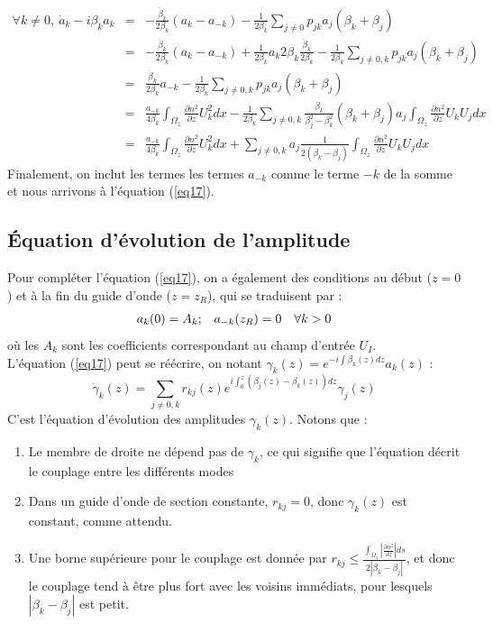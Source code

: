 \documentclass{article}
\begin{document}
\begin{eqnarray*}
\forall k\neq 0,\ \dot{a}_k-i\beta_ka_k&=&-\frac{\dot{\beta}_k}{2\beta_k}(a_k-a_{-k})-\frac{1}{2\beta_k}\sum_{j\neq 0}p_{jk}a_j(\beta_k+\beta_j)\\
		&=&-\frac{\dot{\beta}_k}{2\beta_k}(a_k-a_{-k})+\frac{1}{2\beta_k}a_k2\beta_k\frac{\dot{\beta}_k}{2\beta_k}-\frac{1}{2\beta_k}\sum_{j\neq 0,k}p_{jk}a_j(\beta_k+\beta_j)\\
		&=&\frac{\dot{\beta}_k}{2\beta_k}a_{-k}-\frac{1}{2\beta_k}\sum_{j\neq 0,k}p_{jk}a_j(\beta_k+\beta_j)\\
		&=&\frac{a_{-k}}{4\beta_k}\int_{\Omega_z}\frac{\partial n^2}{\partial z}U_k^2dx-\frac{1}{2\beta_k}\sum_{j\neq 0,k}\frac{\beta_k}{\beta_j^2-\beta_k^2}(\beta_k+\beta_j)a_j\int_{\Omega_z}\frac{\partial n^2}{\partial z}U_kU_jdx\\
		&=&\frac{a_{-k}}{4\beta_k}\int_{\Omega_z}\frac{\partial n^2}{\partial z}U_k^2dx + \sum_{j\neq 0,k} a_j\frac{1}{2(\beta_k-\beta_j)}\int_{\Omega_z}\frac{\partial n^2}{\partial z}U_kU_jdx\ 
\end{eqnarray*}
Finalement, on inclut les termes les termes $a_{-k}$ comme le terme $-k$ de la somme et nous arrivons à l'équation (\ref{eq17}).

\subsection{Équation d'évolution de l'amplitude}
Pour compléter l'équation (\ref{eq17}), on a également des conditions au début ($z=0$) et à la fin du guide d'onde ($z=z_R$), qui se traduisent par :
\begin{equation}\label{eq18}
\begin{array}{c c c}
	a_k(0)=A_k; & a_{-k}(z_R)=0 & \forall k>0
\end{array}
\end{equation}
où les $A_k$ sont les coefficients correspondant au champ d'entrée $U_I$.\\
L'équation (\ref{eq17}) peut se réécrire, on notant $\gamma_k(z)=e^{-i\int \beta_k(z)dz}a_k(z)$ :
\begin{equation}\label{eq19}
	 \dot{\gamma}_k(z)=\sum_{j\neq 0,k} r_{kj}(z)e^{i\int_0^z (\beta_j(z)-\beta_k(z))dz}\gamma_j(z)
\end{equation}
C'est l'équation d'évolution des amplitudes $\gamma_k(z)$. Notons que :
\begin{enumerate}
\item Le membre de droite ne dépend pas de $\gamma_k$, ce qui signifie que l'équation décrit le couplage entre les différents modes
\item Dans un guide d'onde de section constante, $r_{kj}=0$, donc $\gamma_k(z)$ est constant, comme attendu.
\item Une borne supérieure pour le couplage est donnée par $r_{kj}\leq \frac{\int_{\Omega_z} \left|\frac{\partial n^2}{\partial z}\right|ds}{2|\beta_k-\beta_j|}$, et donc le couplage tend à être plus fort avec les voisins immédiats, pour lesquels $|\beta_k-\beta_j|$ est petit.
\end{enumerate}
\end{document}
